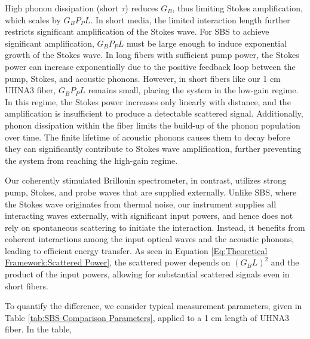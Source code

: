 \documentclass[%
  reprint,
  superscriptaddress,
  amsmath,amssymb,
  aps,
  prapplied,
]{revtex4-2}
\begin{document}
High phonon dissipation (short $\tau$) reduces $G_{B}$, thus limiting Stokes amplification, which scales by $G_{B}P_{P}L$. In short media, the limited interaction length further restricts significant amplification of the Stokes wave. For SBS to achieve significant amplification, $G_{B}P_{P}L$ must be large enough to induce exponential growth of the Stokes wave. In long fibers with sufficient pump power, the Stokes power can increase exponentially due to the positive feedback loop between the pump, Stokes, and acoustic phonons. However, in short fibers like our 1 cm UHNA3 fiber, $G_{B}P_{P}L$ remains small, placing the system in the low-gain regime. In this regime, the Stokes power increases only linearly with distance, and the amplification is insufficient to produce a detectable scattered signal. Additionally, phonon dissipation within the fiber limits the build-up of the phonon population over time. The finite lifetime of acoustic phonons causes them to decay before they can significantly contribute to Stokes wave amplification, further preventing the system from reaching the high-gain regime.

Our coherently stimulated Brillouin spectrometer, in contrast, utilizes strong pump, Stokes, and probe waves that are supplied externally. Unlike SBS, where the Stokes wave originates from thermal noise, our instrument supplies all interacting waves externally, with significant input powers, and hence does not rely on spontaneous scattering to initiate the interaction. Instead, it benefits from coherent interactions among the input optical waves and the acoustic phonons, leading to efficient energy transfer. As seen in Equation \ref{Eq:Theoretical Framework:Scattered Power}, the scattered power depends on $(G_{B} L)^{2}$ and the product of the input powers, allowing for substantial scattered signals even in short fibers.

To quantify the difference, we consider typical measurement parameters, given in Table \ref{tab:SBS Comparison Parameters}, applied to a 1 cm length of UHNA3 fiber. In the table,
\end{document}
